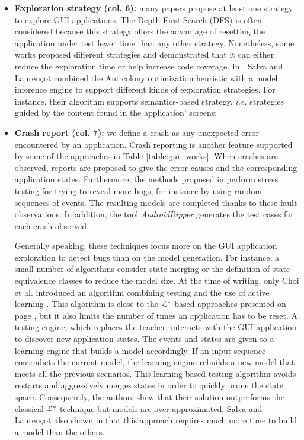 \begin{itemize}
	\item \textbf{Exploration strategy (col. 6):} many
	papers propose at least one strategy to explore GUI
	applications. The Depth-First Search (DFS) is often
	considered because this strategy offers the advantage of
	resetting the application under test fewer time than any other
	strategy. Nonetheless, some works proposed different strategies
	\cite{Amalfitano:2012:UGR:2351676.2351717,5954416,crawljax:tweb12,WPX13}
	and demonstrated that it can either reduce the exploration
    time or help increase code coverage. In \cite{SP15}, Salva
	and Laurençot combined the Ant colony optimization heuristic
	with a model inference engine to support different kinds of
	exploration strategies. For instance, their algorithm
	supports semantics-based strategy, \emph{i.e.} strategies guided by
	the content found in the application' screens;

	\item \textbf{Crash report (col. 7):} we define a crash as
	any unexpected error encountered by an application.  Crash
	reporting is another feature supported by some of the
	approaches in Table \ref{table:gui_works}.  When crashes
	are observed, reports are proposed to give the error causes
	and the corresponding application states. Furthermore, the
	methods proposed in
	\cite{MobiGUITARIEEESoftware2014,guitar,SP15} perform stress
	testing for trying to reveal more bugs,  for instance by
	using random sequences of events. The resulting models are
	completed thanks to these fault observations. In addition,
	the tool \textit{AndroidRipper}
	\cite{Amalfitano:2012:UGR:2351676.2351717} generates the test
	cases for each crash observed.

	Generally speaking, these techniques focus more on the GUI
	application exploration to detect bugs than on the model
	generation. For instance, a small number of algorithms consider state
	merging or the definition of state equivalence classes to
	reduce the model size. At the time of writing, only Choi et
	al. introduced an algorithm combining testing and the use
	of active learning \cite{Choi2013}. This algorithm is close
    to the $\EuScript{L}^*$-based approaches presented on page
	\pageref{sec:active-letoile}, but it also limits the number of
	times an application has to be reset. A testing engine, which
	replaces the teacher, interacts with the GUI application to
	discover new application states. The events and states are
	given to a learning engine that builds a model accordingly.
	If an input sequence contradicts the current model, the
	learning engine rebuilds a new model that meets all the
	previous scenarios.  This learning-based testing algorithm
	avoids restarts and aggressively merges states in order to
	quickly prune the state space. Consequently, the authors show
	that their solution outperforms the classical
	$\EuScript{L}^*$ technique but models are over-approximated.
	Salva and Laurençot also shown in \cite{SP15} that this
	approach requires much more time to build a model than the
	others.
\end{itemize}

